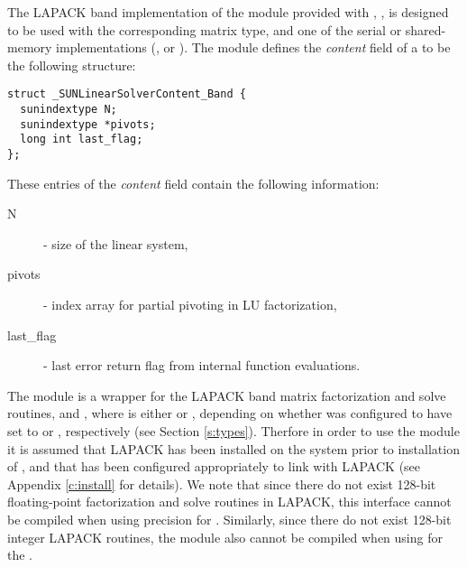 
The LAPACK band implementation of the {\sunlinsol} module provided
with {\sundials}, {\sunlinsollapband}, is designed to be used with the
corresponding {\sunmatband} matrix type, and one of the serial or
shared-memory {\nvector} implementations ({\nvecs}, {\nvecopenmp} or
{\nvecpthreads}).  The {\sunlinsollapband} module defines the {\em
content} field of a  to be the following structure:
\begin{verbatim} 
struct _SUNLinearSolverContent_Band {
  sunindextype N;
  sunindextype *pivots;
  long int last_flag;
};
\end{verbatim}
These entries of the \emph{content} field contain the following
information:
\begin{description}
  \item[N] - size of the linear system,
  \item[pivots] - index array for partial pivoting in LU factorization,
  \item[last\_flag] - last error return flag from internal function evaluations.
\end{description}

{\warn} The {\sunlinsollapband} module is a {\sunlinsol} wrapper for
the LAPACK band matrix factorization and solve routines, 
and , where \id{*} is either  or , depending on
whether {\sundials} was configured to have  set to
 or , respectively (see Section \ref{s:types}).
Therfore in order to use the {\sunlinsollapband} module it is assumed
that LAPACK has been installed on the system prior to installation of
{\sundials}, and that {\sundials} has been configured appropriately to
link with LAPACK (see Appendix \ref{c:install} for details).  We note
that since there do not exist 128-bit floating-point factorization and
solve routines in LAPACK, this interface cannot be compiled when
using  precision for .  Similarly, since
there do not exist 128-bit integer LAPACK routines, the
{\sunlinsollapband} module also cannot be compiled when using 
 for the .

